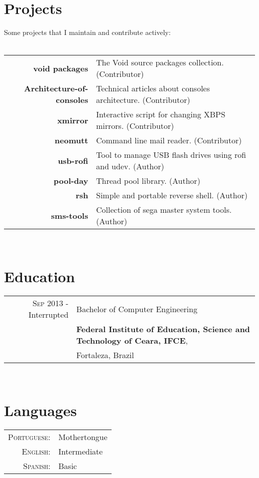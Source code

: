 \documentclass[a4paper,10pt]{article}
\begin{document}
\section{Projects}
\footnotesize{Some projects that I maintain and contribute actively:}\\ \\
\begin{tabular}{rl}
  \textbf{void packages}& The Void source packages collection. (Contributor)\\
  \textbf{Architecture-of-consoles}& Technical articles about consoles architecture. (Contributor)\\
  \textbf{xmirror}& Interactive script for changing XBPS mirrors. (Contributor)\\
  \textbf{neomutt}& Command line mail reader. (Contributor)\\
  \textbf{usb-rofi}& Tool to manage USB flash drives using rofi and udev. (Author)\\
  \textbf{pool-day}& Thread pool library. (Author)\\
  \textbf{rsh}& Simple and portable reverse shell. (Author)\\
  \textbf{sms-tools}& Collection of sega master system tools. (Author)\\
\end{tabular} \\

\section{Education}
\begin{tabular}{rl}
  \textsc{Sep} 2013 - Interrupted & Bachelor of Computer Engineering \\ & \textbf{Federal Institute of Education, Science and Technology of Ceara, IFCE}, \\ & Fortaleza,  Brazil
\end{tabular} \\

\section{Languages}
\begin{tabular}{rl}
  \textsc{Portuguese:}& Mothertongue\\
  \textsc{English:}& Intermediate\\
  \textsc{Spanish:}& Basic\\
\end{tabular}
\end{document}
